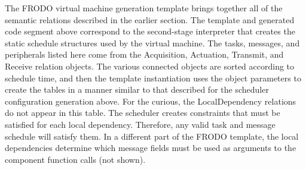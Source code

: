 The FRODO virtual machine generation template brings together all of the
semantic relations described in the earlier section.  The template and generated code
segment above correspond to the second-stage interpreter that creates the static schedule
structures used by the virtual machine.  The tasks, messages, and peripherals
listed here come from the Acquisition, Actuation, Transmit, and Receive
relation objects.  The various connected objects are sorted according to
schedule time, and then the template instantiation uses the object parameters
to create the tables in a manner similar to that described for the scheduler
configuration generation above.  For the curious, the LocalDependency relations
do not appear in this table.  The scheduler creates constraints that must be
satisfied for each local dependency.  Therefore, any valid task and message
schedule will satisfy them.  In a different part of the FRODO template, the
local dependencies determine which message fields must be used as
arguments to the component function calls (not shown).